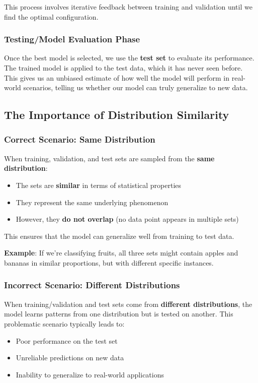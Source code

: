 \documentclass[11pt,a4paper]{article}
\theoremstyle{definition}
\theoremstyle{plain}
\theoremstyle{remark}
\begin{document}
This process involves iterative feedback between training and validation until we find the optimal configuration.

\subsubsection{Testing/Model Evaluation Phase}

Once the best model is selected, we use the \textbf{test set} to evaluate its performance. The trained model is applied to the test data, which it has never seen before. This gives us an unbiased estimate of how well the model will perform in real-world scenarios, telling us whether our model can truly generalize to new data.

\subsection{The Importance of Distribution Similarity}

\subsubsection{Correct Scenario: Same Distribution}

When training, validation, and test sets are sampled from the \textbf{same distribution}:
\begin{itemize}
    \item The sets are \textbf{similar} in terms of statistical properties
    \item They represent the same underlying phenomenon
    \item However, they \textbf{do not overlap} (no data point appears in multiple sets)
\end{itemize}

This ensures that the model can generalize well from training to test data.

\textbf{Example}: If we're classifying fruits, all three sets might contain apples and bananas in similar proportions, but with different specific instances.

\subsubsection{Incorrect Scenario: Different Distributions}

When training/validation and test sets come from \textbf{different distributions}, the model learns patterns from one distribution but is tested on another. This problematic scenario typically leads to:
\begin{itemize}
    \item Poor performance on the test set
    \item Unreliable predictions on new data
    \item Inability to generalize to real-world applications
\end{itemize}
\end{document}
